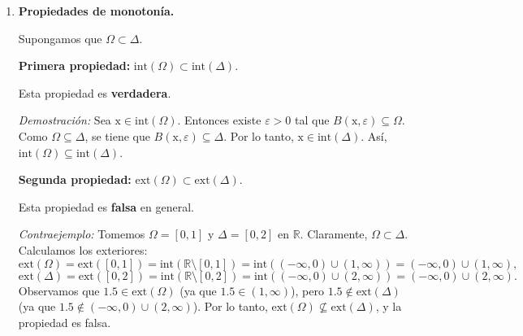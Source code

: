 \documentclass[12pt]{article}
\newcommand{\Ext}{\mathrm{ext}}
\newcommand{\Int}{\mathrm{int}}
\newcommand{\R}{\mathbb R}
\newcommand{\x}{\mathrm x}
\begin{document}
\begin{enumerate}
\begin{enumerate}[(1)]
\textbf{Segunda propiedad:} $\partial(\Omega\cap \Delta) = \partial \Omega\cap \partial \Delta$.

Esta propiedad es \textbf{falsa} en general.

\textit{Contraejemplo:} Tomemos $\Omega = [0,1]$ y $\Delta = [1,2]$ en $\R$. Entonces $\Omega \cap \Delta = \{1\}$. Calculamos las fronteras:
\[
\partial(\Omega \cap \Delta) = \partial(\{1\}) = \{1\},
\]
mientras que
\[
\partial \Omega \cap \partial \Delta = \partial([0,1]) \cap \partial([1,2]) = \{0, 1\} \cap \{1, 2\} = \{1\}.
\]
En este caso, la igualdad sí se cumple. Necesitamos otro contraejemplo.

\textit{Contraejemplo mejor:} Tomemos $\Omega = [0,2]$ y $\Delta = [1,3]$ en $\R$. Entonces $\Omega \cap \Delta = [1,2]$. Calculamos las fronteras:
\[
\partial(\Omega \cap \Delta) = \partial([1,2]) = \{1, 2\},
\]
mientras que
\[
\partial \Omega \cap \partial \Delta = \partial([0,2]) \cap \partial([1,3]) = \{0, 2\} \cap \{1, 3\} = \emptyset.
\]
Claramente, $\partial(\Omega \cap \Delta) = \{1, 2\} \neq \emptyset = \partial \Omega \cap \partial \Delta$. Por lo tanto, la igualdad es falsa.

\item \textbf{Propiedades de monotonía.}

Supongamos que $\Omega \subset \Delta$.

\textbf{Primera propiedad:} $\Int(\Omega)\subset \Int(\Delta)$.

Esta propiedad es \textbf{verdadera}.

\textit{Demostración:} Sea $\x \in \Int(\Omega)$. Entonces existe $\varepsilon > 0$ tal que $B(\x, \varepsilon) \subseteq \Omega$. Como $\Omega \subseteq \Delta$, se tiene que $B(\x, \varepsilon) \subseteq \Delta$. Por lo tanto, $\x \in \Int(\Delta)$. Así, $\Int(\Omega) \subseteq \Int(\Delta)$.

\textbf{Segunda propiedad:} $\Ext(\Omega)\subset \Ext(\Delta)$.

Esta propiedad es \textbf{falsa} en general.

\textit{Contraejemplo:} Tomemos $\Omega = [0,1]$ y $\Delta = [0,2]$ en $\R$. Claramente, $\Omega \subset \Delta$. Calculamos los exteriores:
\[
\Ext(\Omega) = \Ext([0,1]) = \Int(\R \setminus [0,1]) = \Int((-\infty, 0) \cup (1, \infty)) = (-\infty, 0) \cup (1, \infty),
\]
\[
\Ext(\Delta) = \Ext([0,2]) = \Int(\R \setminus [0,2]) = \Int((-\infty, 0) \cup (2, \infty)) = (-\infty, 0) \cup (2, \infty).
\]
Observamos que $1.5 \in \Ext(\Omega)$ (ya que $1.5 \in (1, \infty)$), pero $1.5 \notin \Ext(\Delta)$ (ya que $1.5 \notin (-\infty, 0) \cup (2, \infty)$). Por lo tanto, $\Ext(\Omega) \not\subseteq \Ext(\Delta)$, y la propiedad es falsa.


\end{enumerate}
\end{enumerate}
\end{document}
